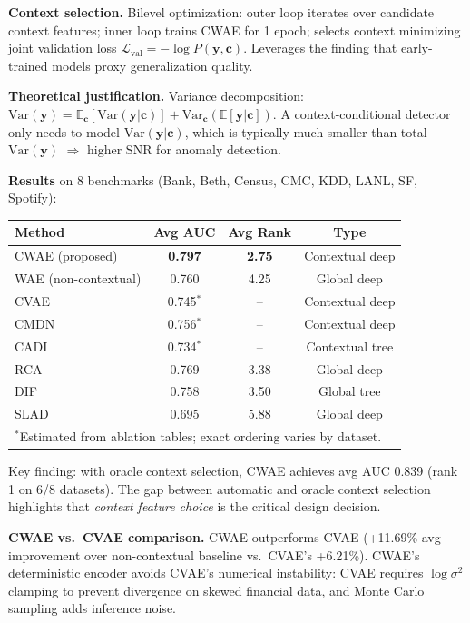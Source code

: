 \documentclass[11pt]{article}
\begin{document}
\textbf{Context selection.} Bilevel optimization: outer loop iterates over candidate context features; inner loop trains CWAE for 1 epoch; selects context minimizing joint validation loss $\mathcal{L}_{\mathrm{val}} = -\log P(\mathbf{y}, \mathbf{c})$. Leverages the finding that early-trained models proxy generalization quality.

\textbf{Theoretical justification.} Variance decomposition: $\mathrm{Var}(\mathbf{y}) = \mathbb{E}_{\mathbf{c}}[\mathrm{Var}(\mathbf{y}|\mathbf{c})] + \mathrm{Var}_{\mathbf{c}}(\mathbb{E}[\mathbf{y}|\mathbf{c}])$. A context-conditional detector only needs to model $\mathrm{Var}(\mathbf{y}|\mathbf{c})$, which is typically much smaller than total $\mathrm{Var}(\mathbf{y})$ $\Rightarrow$ higher SNR for anomaly detection.

\textbf{Results} on 8 benchmarks (Bank, Beth, Census, CMC, KDD, LANL, SF, Spotify):

\begin{center}
\small
\begin{tabular}{lccc}
\toprule
\textbf{Method} & \textbf{Avg AUC} & \textbf{Avg Rank} & \textbf{Type} \\
\midrule
CWAE (proposed) & \textbf{0.797} & \textbf{2.75} & Contextual deep \\
WAE (non-contextual) & 0.760 & 4.25 & Global deep \\
CVAE & 0.745$^*$ & -- & Contextual deep \\
CMDN & 0.756$^*$ & -- & Contextual deep \\
CADI & 0.734$^*$ & -- & Contextual tree \\
RCA & 0.769 & 3.38 & Global deep \\
DIF & 0.758 & 3.50 & Global tree \\
SLAD & 0.695 & 5.88 & Global deep \\
\bottomrule
\multicolumn{4}{l}{\scriptsize $^*$Estimated from ablation tables; exact ordering varies by dataset.}
\end{tabular}
\end{center}

Key finding: with oracle context selection, CWAE achieves avg AUC 0.839 (rank 1 on 6/8 datasets). The gap between automatic and oracle context selection highlights that \textit{context feature choice} is the critical design decision.

\textbf{CWAE vs.\ CVAE comparison.} CWAE outperforms CVAE (+11.69\% avg improvement over non-contextual baseline vs.\ CVAE's +6.21\%). CWAE's deterministic encoder avoids CVAE's numerical instability: CVAE requires $\log\sigma^2$ clamping to prevent divergence on skewed financial data, and Monte Carlo sampling adds inference noise.
\end{document}
